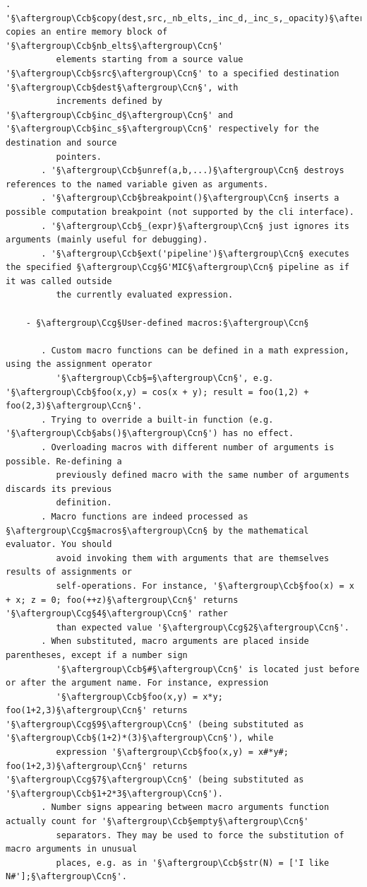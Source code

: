 \documentclass[a4paper,10.5pt,twoside]{book}
\def\Ccb{\color{cb}}
\def\Ccg{\color{cc}}
\def\Ccn{\color{black}}
\begin{document}
\begin{lstlisting}[escapechar=§]
       . '§\aftergroup\Ccb§copy(dest,src,_nb_elts,_inc_d,_inc_s,_opacity)§\aftergroup\Ccn§ copies an entire memory block of '§\aftergroup\Ccb§nb_elts§\aftergroup\Ccn§' 
          elements starting from a source value '§\aftergroup\Ccb§src§\aftergroup\Ccn§' to a specified destination '§\aftergroup\Ccb§dest§\aftergroup\Ccn§', with 
          increments defined by '§\aftergroup\Ccb§inc_d§\aftergroup\Ccn§' and '§\aftergroup\Ccb§inc_s§\aftergroup\Ccn§' respectively for the destination and source 
          pointers. 
       . '§\aftergroup\Ccb§unref(a,b,...)§\aftergroup\Ccn§ destroys references to the named variable given as arguments. 
       . '§\aftergroup\Ccb§breakpoint()§\aftergroup\Ccn§ inserts a possible computation breakpoint (not supported by the cli interface). 
       . '§\aftergroup\Ccb§_(expr)§\aftergroup\Ccn§ just ignores its arguments (mainly useful for debugging). 
       . '§\aftergroup\Ccb§ext('pipeline')§\aftergroup\Ccn§ executes the specified §\aftergroup\Ccg§G'MIC§\aftergroup\Ccn§ pipeline as if it was called outside 
          the currently evaluated expression. 
 
    - §\aftergroup\Ccg§User-defined macros:§\aftergroup\Ccn§ 
 
       . Custom macro functions can be defined in a math expression, using the assignment operator 
          '§\aftergroup\Ccb§=§\aftergroup\Ccn§', e.g. '§\aftergroup\Ccb§foo(x,y) = cos(x + y); result = foo(1,2) + foo(2,3)§\aftergroup\Ccn§'. 
       . Trying to override a built-in function (e.g. '§\aftergroup\Ccb§abs()§\aftergroup\Ccn§') has no effect. 
       . Overloading macros with different number of arguments is possible. Re-defining a 
          previously defined macro with the same number of arguments discards its previous 
          definition. 
       . Macro functions are indeed processed as §\aftergroup\Ccg§macros§\aftergroup\Ccn§ by the mathematical evaluator. You should 
          avoid invoking them with arguments that are themselves results of assignments or 
          self-operations. For instance, '§\aftergroup\Ccb§foo(x) = x + x; z = 0; foo(++z)§\aftergroup\Ccn§' returns '§\aftergroup\Ccg§4§\aftergroup\Ccn§' rather 
          than expected value '§\aftergroup\Ccg§2§\aftergroup\Ccn§'. 
       . When substituted, macro arguments are placed inside parentheses, except if a number sign 
          '§\aftergroup\Ccb§#§\aftergroup\Ccn§' is located just before or after the argument name. For instance, expression 
          '§\aftergroup\Ccb§foo(x,y) = x*y; foo(1+2,3)§\aftergroup\Ccn§' returns '§\aftergroup\Ccg§9§\aftergroup\Ccn§' (being substituted as '§\aftergroup\Ccb§(1+2)*(3)§\aftergroup\Ccn§'), while 
          expression '§\aftergroup\Ccb§foo(x,y) = x#*y#; foo(1+2,3)§\aftergroup\Ccn§' returns '§\aftergroup\Ccg§7§\aftergroup\Ccn§' (being substituted as '§\aftergroup\Ccb§1+2*3§\aftergroup\Ccn§'). 
       . Number signs appearing between macro arguments function actually count for '§\aftergroup\Ccb§empty§\aftergroup\Ccn§' 
          separators. They may be used to force the substitution of macro arguments in unusual 
          places, e.g. as in '§\aftergroup\Ccb§str(N) = ['I like N#'];§\aftergroup\Ccn§'. 
 

\end{lstlisting}
\end{document}
